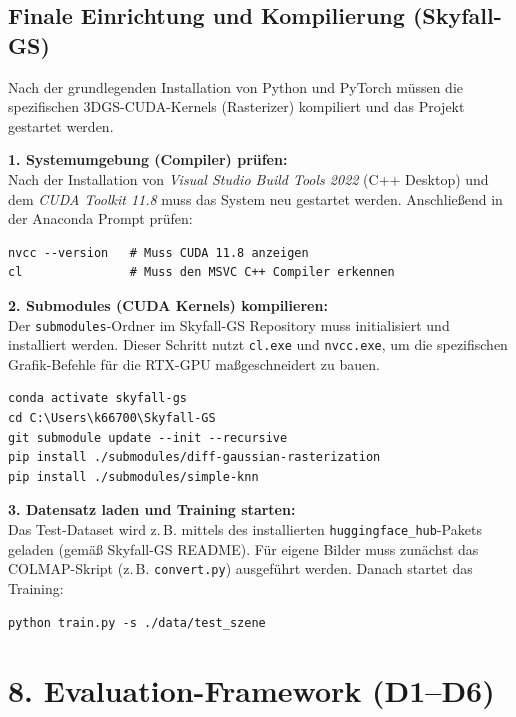 \documentclass[11pt, a4paper]{article}
\begin{document}
\subsection{Finale Einrichtung und Kompilierung (Skyfall-GS)}
Nach der grundlegenden Installation von Python und PyTorch m\"ussen die spezifischen 3DGS-CUDA-Kernels (Rasterizer) kompiliert und das Projekt gestartet werden.

\textbf{1. Systemumgebung (Compiler) pr\"ufen:}\\
Nach der Installation von \textit{Visual Studio Build Tools 2022} (C++ Desktop) und dem \textit{CUDA Toolkit 11.8} muss das System neu gestartet werden. Anschlie\ss end in der Anaconda Prompt pr\"ufen:
\begin{lstlisting}
nvcc --version   # Muss CUDA 11.8 anzeigen
cl               # Muss den MSVC C++ Compiler erkennen
\end{lstlisting}

\textbf{2. Submodules (CUDA Kernels) kompilieren:}\\
Der \texttt{submodules}-Ordner im Skyfall-GS Repository muss initialisiert und installiert werden. Dieser Schritt nutzt \texttt{cl.exe} und \texttt{nvcc.exe}, um die spezifischen Grafik-Befehle f\"ur die RTX-GPU ma\ss geschneidert zu bauen.
\begin{lstlisting}
conda activate skyfall-gs
cd C:\Users\k66700\Skyfall-GS
git submodule update --init --recursive
pip install ./submodules/diff-gaussian-rasterization
pip install ./submodules/simple-knn
\end{lstlisting}

\textbf{3. Datensatz laden und Training starten:}\\
Das Test-Dataset wird z.\,B. mittels des installierten \texttt{huggingface\_hub}-Pakets geladen (gem\"a\ss{} Skyfall-GS README). F\"ur eigene Bilder muss zun\"achst das COLMAP-Skript (z.\,B. \texttt{convert.py}) ausgef\"uhrt werden. Danach startet das Training:
\begin{lstlisting}
python train.py -s ./data/test_szene
\end{lstlisting}

\section{8. Evaluation-Framework (D1--D6)}
\end{document}
